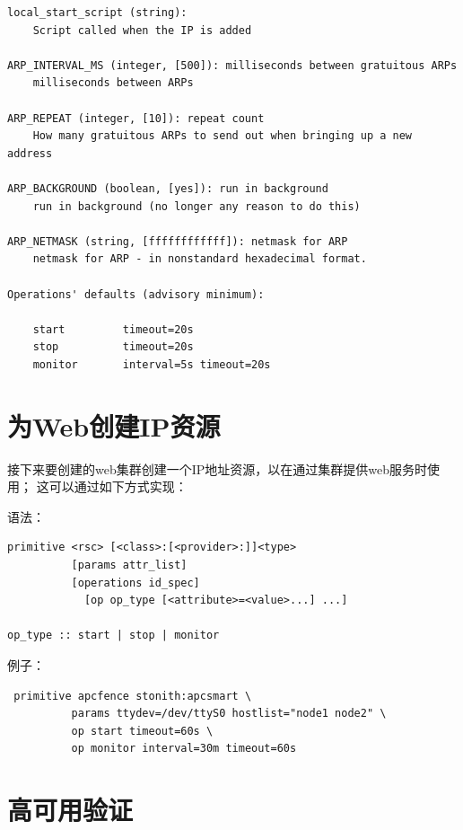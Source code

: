 \begin{verbatim}
local_start_script (string): 
    Script called when the IP is added

ARP_INTERVAL_MS (integer, [500]): milliseconds between gratuitous ARPs
    milliseconds between ARPs

ARP_REPEAT (integer, [10]): repeat count
    How many gratuitous ARPs to send out when bringing up a new address

ARP_BACKGROUND (boolean, [yes]): run in background
    run in background (no longer any reason to do this)

ARP_NETMASK (string, [ffffffffffff]): netmask for ARP
    netmask for ARP - in nonstandard hexadecimal format.

Operations' defaults (advisory minimum):

    start         timeout=20s
    stop          timeout=20s
    monitor       interval=5s timeout=20s
\end{verbatim}

\section{为Web创建IP资源}

接下来要创建的web集群创建一个IP地址资源，以在通过集群提供web服务时使用；
这可以通过如下方式实现：

语法：

\begin{verbatim}
primitive <rsc> [<class>:[<provider>:]]<type>
          [params attr_list]
          [operations id_spec]
            [op op_type [<attribute>=<value>...] ...]

op_type :: start | stop | monitor
\end{verbatim}

例子：

\begin{verbatim}
 primitive apcfence stonith:apcsmart \
          params ttydev=/dev/ttyS0 hostlist="node1 node2" \
          op start timeout=60s \
          op monitor interval=30m timeout=60s
\end{verbatim}


\section{高可用验证}